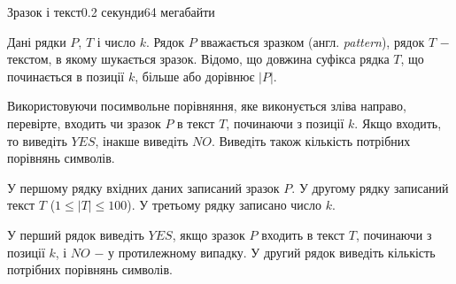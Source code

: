 \begin{problem}{Зразок і текст}{}{}{0.2 секунди}{64 мегабайти}

Дані рядки $P$, $T$ і число $k$. Рядок $P$ вважається зразком (англ. {\it pattern}), рядок $T$ $-$ текстом, в якому шукається зразок. 
Відомо, що довжина суфікса рядка $T$, що починається в позиції $k$, більше або дорівнює $|P|$. 

Використовуючи посимвольне порівняння, яке виконується зліва направо, перевірте, входить чи зразок $P$ в текст $T$, починаючи з позиції $k$. 
Якщо входить, то виведіть $YES$, інакше виведіть $NO$. Виведіть також кількість потрібних порівнянь символів. 

\InputFile
У першому рядку вхідних даних записаний зразок $P$.
У другому рядку записаний текст $T$ ($1 \le |T| \le 100$).
У третьому рядку записано число $k$.

\OutputFile
У перший рядок виведіть $YES$, якщо зразок $P$ входить в текст $T$, 
починаючи з позиції $k$, і $NO$ $-$ у протилежному випадку.
У другий рядок виведіть кількість потрібних порівнянь символів.

\Examples

\begin{example}
%
%
\end{example}

\end{problem}

